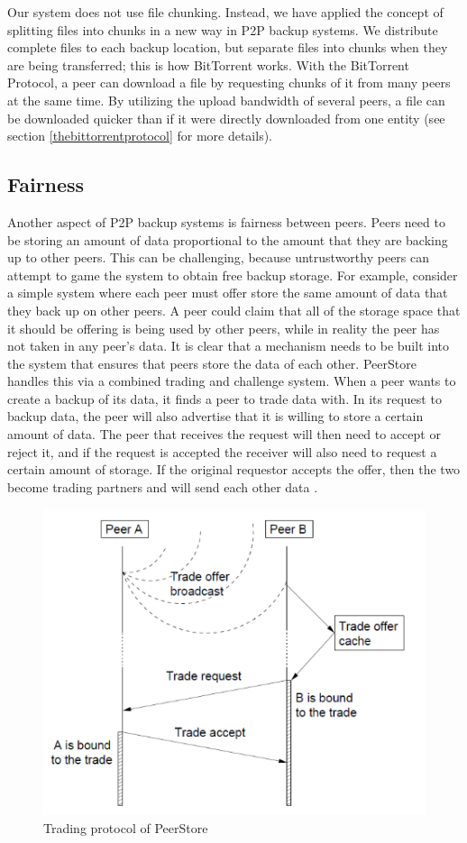 \documentclass[12pt]{report}
\begin{document}
Our system does not use file chunking. Instead, we have applied the concept of splitting files into chunks in a new way in P2P backup systems. We distribute complete files to each backup location, but separate files into chunks when they are being transferred; this is how BitTorrent works. With the BitTorrent Protocol, a peer can download a file by requesting chunks of it from many peers at the same time. By utilizing the upload bandwidth of several peers, a file can be downloaded quicker than if it were directly downloaded from one entity (see section \ref{thebittorrentprotocol} for more details).

\subsection{Fairness}
Another aspect of P2P backup systems is fairness between peers. Peers need to be storing an amount of data proportional to the amount that they are backing up to other peers. This can be challenging, because untrustworthy peers can attempt to game the system to obtain free backup storage. For example, consider a simple system where each peer must offer store the same amount of data that they back up on other peers. A peer could claim that all of the storage space that it should be offering is being used by other peers, while in reality the peer has not taken in any peer's data. It is clear that a mechanism needs to be built into the system that ensures that peers store the data of each other. PeerStore handles this via a combined trading and challenge system. When a peer wants to create a backup of its data, it finds a peer to trade data with. In its request to backup data, the peer will also advertise that it is willing to store a certain amount of data. The peer that receives the request will then need to accept or reject it, and if the request is accepted the receiver will also need to request a certain amount of storage. If the original requestor accepts the offer, then the two become trading partners and will send each other data \cite{PeerStore}.

\begin{figure}
  \centering
  \includegraphics[scale=0.75]{PeerStoreTrading}
  \caption{Trading protocol of PeerStore}
\end{figure}
\end{document}
